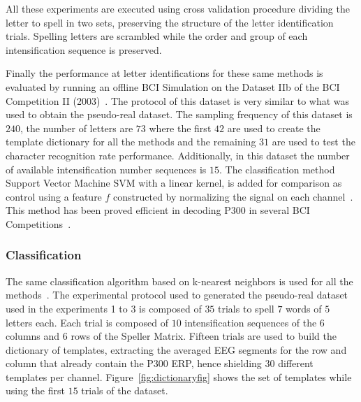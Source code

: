 \documentclass[brainsci,article,accept,moreauthors,pdftex,10pt,a4paper]{mdpi}
\begin{document}
All these experiments are executed using cross validation procedure dividing the letter to spell in two sets, preserving the structure of the letter identification trials. Spelling letters are scrambled while the order and group of each intensification sequence is preserved.

Finally the performance at letter identifications for these same methods is evaluated by running an offline BCI Simulation on the Dataset IIb of the BCI Competition II (2003)~\citep{Blankertz2002}.  The protocol of this dataset is very similar to what was used to obtain the pseudo-real dataset.  The sampling frequency of this dataset is $240$, the number of letters are $73$ where the first $42$ are used to create the template dictionary for all the methods and the remaining $31$ are used to test the character recognition rate performance.  Additionally, in this dataset the number of available intensification number sequences is $15$.  The classification method Support Vector Machine SVM with a linear kernel, is added for comparison as control using a feature $f$ constructed by normalizing the signal on each channel~\citep{Krusienski2006}.  This method has been proved efficient in decoding P300 in several BCI Competitions~\citep{Kaper2004}. 



\subsubsection{Classification} \label{section:classification}

The same classification algorithm based on k-nearest neighbors is used for all the methods~\citep{Boiman2008}.   The experimental protocol used to generated the pseudo-real dataset used in the experiments 1 to 3 is composed of $35$ trials to spell $7$ words of $5$ letters each.  Each trial is composed of $10$ intensification sequences of the $6$ columns and $6$ rows of the Speller Matrix.  Fifteen trials are used to build the dictionary of templates, extracting the averaged EEG segments for the row and column that already contain the P300 ERP, hence shielding $30$ different templates per channel.  Figure~\ref{fig:dictionaryfig} shows the set of templates while using the first $15$ trials of the dataset.
\end{document}
